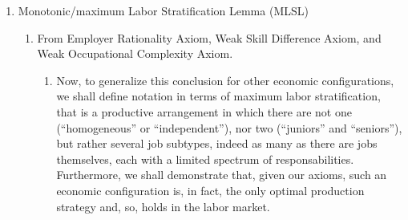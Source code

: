 \documentclass[hidelinks, nonatbib]{elsarticle}
\begin{document}
\begin{enumerate}
\begin{align}
{                1
            }{
                \int_{0}^{\tilde{T}_{q}^{\text{Jr}}}
                    \text{ta}_q(l)
                    dl
            }
            -
            \frac{
                \int_{0}^{\tilde{T}_{q}^{\text{Jr}}}
                    \text{ta}_q(l)
                    dl
            }{
                \int_{0}^{\tilde{T}_{q}^{\text{Jr}}}
                    \text{ta}_q(l)
                    dl
            }
        \right) ^ {-1}
        \\&=
        \left(
            1 + 
            \frac{
                1
            }{
                \int_{0}^{\tilde{T}_{q}^{\text{Jr}}}
                    \text{ta}_q(l)
                    dl
            }
            -
            1
        \right) ^ {-1}
        \\&=
        \left(
            \frac{
                1
            }{
                \int_{0}^{\tilde{T}_{q}^{\text{Jr}}}
                    \text{ta}_q(l)
                    dl
            }
        \right) ^ {-1}
        \\&=
        \int_{0}^{\tilde{T}_{q}^{\text{Jr}}}
            \text{ta}_q(l)
            dl
        .
    \end{align}

    thus, the employability of a partially qualified worker, that is a ``junior'', is precisely the percentage of an operation's total time duration their skill set allows them to accomplish (i.e. the inverse of their operational output).

    \item Monotonic/maximum Labor Stratification Lemma (MLSL)
    \begin{enumerate}
        \item From Employer Rationality Axiom, Weak Skill Difference Axiom, and Weak Occupational Complexity Axiom.
        \begin{enumerate}
            \item Now, to generalize this conclusion for other economic configurations, we shall define notation in terms of maximum labor stratification, that is a productive arrangement in which there are not one (``homogeneous'' or ``independent''), nor two (``juniors'' and ``seniors''), but rather several job subtypes, indeed as many as there are jobs themselves, each with a limited spectrum of responsabilities. Furthermore, we shall demonstrate that, given our axioms, such an economic configuration is, in fact, the only optimal production strategy and, so, holds in the labor market.
            

\end{enumerate}
\end{enumerate}
\end{enumerate}
\end{document}
